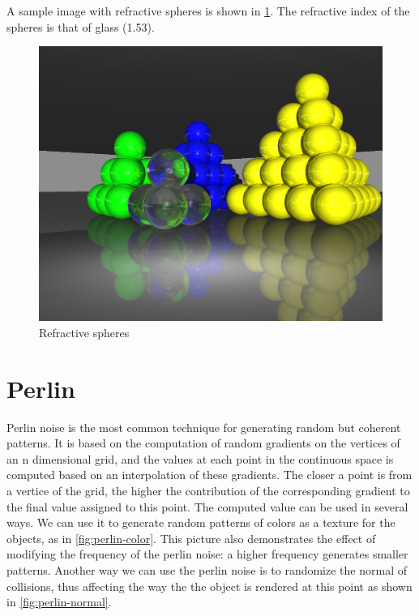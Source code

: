\documentclass[a4paper,12pt,journal,twoside,compsoc]{PPIEEEtran}
\begin{document}
A sample image with refractive spheres is shown in \cref{fig:sample-refr}.  The
refractive index of the spheres is that of glass (1.53).

\begin{figure}
  \begin{center}
    \includegraphics[width=0.7\linewidth]{sample-refraction.png}
  \end{center}
  \caption{Refractive spheres}
  \label{fig:sample-refr}
\end{figure}

\section{Perlin}

Perlin noise is the most common technique for generating random but coherent
patterns.  It is based on the computation of random gradients on the vertices of
an n dimensional grid, and the values at each point in the continuous space is
computed based on an interpolation of these gradients.  The closer a point is
from a vertice of the grid, the higher the contribution of the corresponding
gradient to the final value assigned to this point.  The computed value can be
used in several ways.  We can use it to generate random patterns of colors as a
texture for the objects, as in \cref{fig:perlin-color}.  This picture also
demonstrates the effect of modifying the frequency of the perlin noise: a higher
frequency generates smaller patterns.  Another way we can use the perlin noise
is to randomize the normal of collisions, thus affecting the way the the object
is rendered at this point as shown in \cref{fig:perlin-normal}.
\end{document}
